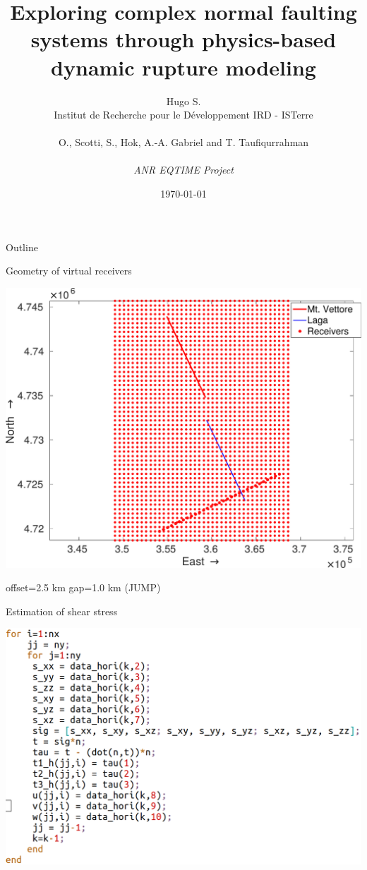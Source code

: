 \documentclass{beamer}
\title{{\normalsize \vskip 1cm Exploring complex normal faulting systems through physics-based dynamic rupture modeling}}
\subtitle{\small }
\author{Hugo S. \\ {\tiny Institut de Recherche pour le Développement IRD - ISTerre} \\ 
\\
O., Scotti, S., Hok, A.-A. Gabriel and T. Taufiqurrahman \\
\\
\textit{ANR EQTIME Project}
}
\date[2021]{\today}
\begin{document}

\begin{frame}
    \titlepage
\end{frame}

\begin{frame}
 {Outline}
 
 \tableofcontents
 
\end{frame}

\begin{frame}
 {Geometry of virtual receivers}

 \centering
 \includegraphics[width=1.1\linewidth]{images/virtual_rec}
 
 \centering offset=2.5 km gap=1.0 km (JUMP)
 
\end{frame}

\begin{frame}
 {Estimation of shear stress}
 
 \centering
 \includegraphics[width=1\linewidth]{images/formula}
 
\end{frame}
\end{document}
